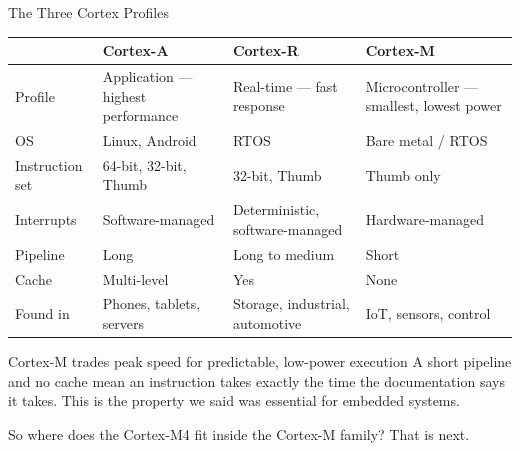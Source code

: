 \documentclass[9pt,aspectratio=169,xcolor=table]{beamer}
\begin{document}
\begin{frame}{The Three Cortex Profiles}
	\begin{center}
		{\small
			\striped
			\begin{tabular}{@{}l R{.24\textwidth} R{.24\textwidth} R{.24\textwidth}@{}}
				\toprule
				& \textbf{Cortex-A} & \textbf{Cortex-R} & \textbf{Cortex-M} \\
				\midrule
				Profile & Application --- highest performance & Real-time --- fast response & Microcontroller --- smallest, lowest power \\
				OS & Linux, Android & RTOS & Bare metal / RTOS \\
		        Instruction set  & 64-bit, 32-bit, Thumb & 32-bit, Thumb & Thumb only \\
				Interrupts  & Software-managed & Deterministic, software-managed & Hardware-managed \\
				Pipeline & Long & Long to medium & {Short} \\
				Cache & Multi-level & Yes & {None} \\
				Found in & Phones, tablets, servers & Storage, industrial, automotive & IoT, sensors, control \\
				\bottomrule
		\end{tabular}}
	\end{center}
	\vspace{3mm}
	\begin{block}{Cortex-M trades peak speed for predictable, low-power execution}
    {\small A short pipeline and no cache mean an instruction takes exactly the time the documentation says it takes. This is the property we said was essential for embedded systems.}
	\end{block}
	\vspace{1mm}
	{\small\centering So where does the Cortex-M4 fit inside the Cortex-M family? That is next.\par}
\end{frame}
\end{document}
